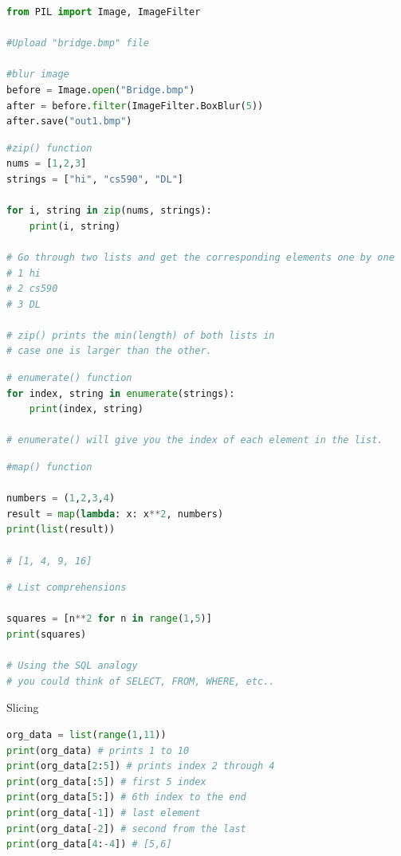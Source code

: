 {\begin{lstlisting}[language=Python, breaklines=true]
from PIL import Image, ImageFilter

#Upload "bridge.bmp" file

#blur image
before = Image.open("Bridge.bmp")
after = before.filter(ImageFilter.BoxBlur(5))
after.save("out1.bmp")
\end{lstlisting}
\vspace{11pt}
\begin{lstlisting}[language=Python, breaklines=true]
#zip() function
nums = [1,2,3]
strings = ["hi", "cs590", "DL"]

for i, string in zip(nums, strings):
    print(i, string)

# Go through two lists and get the corresponding elements one by one
# 1 hi
# 2 cs590
# 3 DL

# zip() prints the min(length) of both lists in 
# case one is larger than the other.
\end{lstlisting}

\vspace{11pt}
\begin{lstlisting}[language=Python, breaklines=true]
# enumerate() function
for index, string in enumerate(strings):
    print(index, string)

# enumerate() will give you the index of each element in the list.
\end{lstlisting}

\vspace{11pt}
\begin{lstlisting}[language=Python, breaklines=true]
#map() function

numbers = (1,2,3,4)
result = map(lambda: x: x**2, numbers)
print(list(result))

# [1, 4, 9, 16]
\end{lstlisting}
\vspace{11pt}
\begin{lstlisting}[language=Python, breaklines=true]
# List comprehensions

squares = [n**2 for n in range(1,5)]
print(squares)

# Using the SQL analogy
# you could think of SELECT, FROM, WHERE, etc..
\end{lstlisting}
\vspace{11pt}
Slicing

\begin{lstlisting}[language=Python, breaklines=true]
org_data = list(range(1,11))
print(org_data) # prints 1 to 10
print(org_data[2:5]) # prints index 2 through 4
print(org_data[:5]) # first 5 index
print(org_data[5:]) # 6th index to the end
print(org_data[-1]) # last element
print(org_data[-2]) # second from the last
print(org_data[4:-4]) # [5,6]
\end{lstlisting}

}
